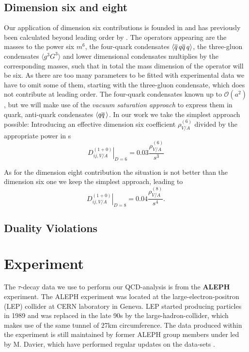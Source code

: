 \documentclass[../../index.tex]{subfiles}
\begin{document}
\subsection{Dimension six and eight}
Our application of dimension six contributions is founded in \cite{Braaten1991}
and has previously been calculated beyond leading order by \cite{Lanin1986}.
The operators appearing are the masses to the power six $m^6$, the four-quark
condensates $\langle \overline{q}\, q \overline{q}\, q \rangle$, the three-gluon condensates
$\langle g^3 G^3 \rangle$ and lower dimensional condensates multiplies by the
corresponding masses, such that in total the mass dimension of the operator will
be six.
As there are too many parameters to be fitted with experimental data we have to
omit some of them, starting with the three-gluon condensate, which does not
contribute at leading order. The four-quark condensates known up to
$\mathcal{O}(a^2)$, but we will make use of the \textit{vacuum saturation
  approach} \cite{Beneke2008,Braaten1991,Shifman1978} to express them in quark, anti-quark condensates $\langle q \overline{q}\, \rangle$.
In our work we take the simplest approach possible: Introducing an effective
dimension six coefficient $\rho_{V/A}^{(6)}$ divided by the appropriate power in s
\begin{equation}
  \left. D_{ij,V/A}^{(1+0)} \right\rvert_{D=6} = 0.03 \frac{\rho_{V/A}^{(6)}}{s^3}
\end{equation}

As for the dimension eight contribution the situation is not better than the
dimension six one we keep the simplest approach, leading to
\begin{equation}
  \left. D_{ij,V/A}^{(1+0)} \right\rvert_{D=8} = 0.04 \frac{\rho_{V/A}^{(8)}}{s^4}.
\end{equation}


\subsection{Duality Violations}


\section{Experiment}
The $\tau$-decay data we use to perform our QCD-analysis is from the
\textbf{ALEPH} experiment. The ALEPH experiment was located at the
large-electron-positron (LEP) collider at CERN laboratory in Geneva. LEP started
producing particles in 1989 and was replaced in the late 90s by the
large-hadron-collider, which makes use of the same tunnel of 27km circumference.
The data produced within the experiment is still maintained by former ALEPH
group members under led by M. Davier, which have performed regular updates on
the data-sets \cite{Davier2013,Davier2008,Aleph2005}.
\end{document}
